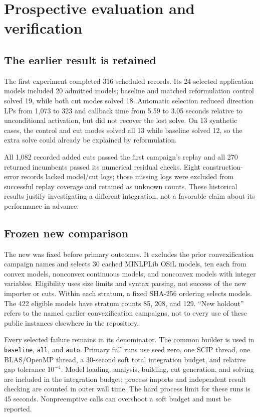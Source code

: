 \section{Prospective evaluation and verification}\label{sec:evidence}

\subsection{The earlier result is retained}

The first experiment completed 316 scheduled records. Its 24 selected
application models included 20 admitted models; baseline and matched
reformulation control solved 19, while both cut modes solved 18.
Automatic selection reduced direction LPs from 1,073 to 323 and callback
time from 5.59 to 3.05 seconds relative to unconditional activation,
but did not recover the lost solve. On 13 synthetic cases, the control
and cut modes solved all 13 while baseline solved 12, so the extra solve
could already be explained by reformulation.

All 1,082 recorded added cuts passed the first campaign's replay and all
270 returned incumbents passed its numerical residual checks. Eight
construction-error records lacked model/cut logs; those missing logs were
excluded from successful replay coverage and retained as unknown counts.
These historical results justify investigating a different integration,
not a favorable claim about its performance in advance.

\subsection{Frozen new comparison}

The new
was fixed before primary outcomes. It excludes the prior convexification
campaign names and selects 30 cached MINLPLib OSiL models, ten each from
convex models, nonconvex continuous models, and nonconvex models with
integer variables. Eligibility uses size limits and syntax parsing, not
success of the new importer or cuts. Within each stratum, a fixed
SHA-256 ordering selects models. The 422 eligible models have stratum
counts 85, 208, and 129. ``New holdout'' refers to the named earlier
convexification campaigns, not to every use of these public instances
elsewhere in the repository.

Every selected failure remains in its denominator. The common builder
is used in \texttt{baseline}, \texttt{all}, and \texttt{auto}. Primary
full runs use seed zero, one SCIP thread, one BLAS/OpenMP thread, a
30-second soft total integration budget, and relative gap tolerance
$10^{-4}$. Model loading, analysis, building, cut generation, and solving
are included in the integration budget; process imports and independent
result checking are counted in outer wall time. The hard process limit
for these runs is 45 seconds. Nonpreemptive calls can overshoot a soft
budget and must be reported.


